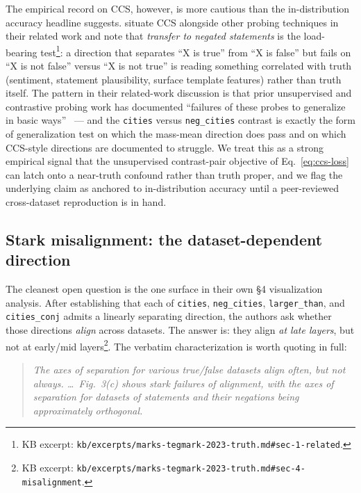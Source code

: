 The empirical record on CCS, however, is more cautious than the
in-distribution accuracy headline suggests.
\citet{marks-tegmark-2023-truth} situate CCS alongside other probing
techniques in their related work and note that \emph{transfer to
negated statements} is the load-bearing
test\footnote{KB excerpt:
\texttt{kb/excerpts/marks-tegmark-2023-truth.md\#sec-1-related}.}: a
direction that separates ``X is true'' from ``X is false'' but fails
on ``X is not false'' versus ``X is not true'' is reading something
correlated with truth (sentiment, statement plausibility, surface
template features) rather than truth itself. The pattern in their
related-work discussion is that prior unsupervised and contrastive
probing work has documented ``failures of these probes to generalize
in basic ways''~\citep[abstract]{marks-tegmark-2023-truth} --- and the
\texttt{cities} versus \texttt{neg\_cities} contrast is exactly the
form of generalization test on which the
\citeauthor{marks-tegmark-2023-truth} mass-mean direction does pass
and on which CCS-style directions are documented to struggle. We
treat this as a strong empirical signal that the unsupervised
contrast-pair objective of Eq.~\eqref{eq:ccs-loss} can latch onto a
near-truth confound rather than truth proper, and we flag the
underlying claim as anchored to in-distribution accuracy until a
peer-reviewed cross-dataset reproduction is in hand.

\subsection{Stark misalignment: the dataset-dependent direction}
\label{sec:truth-misalignment}

The cleanest open question is the one
\citet{marks-tegmark-2023-truth} surface in their own \S 4 visualization
analysis. After establishing that each of \texttt{cities},
\texttt{neg\_cities}, \texttt{larger\_than}, and \texttt{cities\_conj}
admits a linearly separating direction, the authors ask whether those
directions \emph{align} across datasets. The answer is: they align
\emph{at late layers}, but not at early/mid
layers\footnote{KB excerpt:
\texttt{kb/excerpts/marks-tegmark-2023-truth.md\#sec-4-misalignment}.}.
The verbatim characterization is worth quoting in full:

\begin{quote}
\itshape
The axes of separation for various true/false datasets align often,
but not always. \dots\ Fig.~3(c) shows stark failures of alignment,
with the axes of separation for datasets of statements and their
negations being approximately
orthogonal.~\citep[\S 4]{marks-tegmark-2023-truth}
\end{quote}


